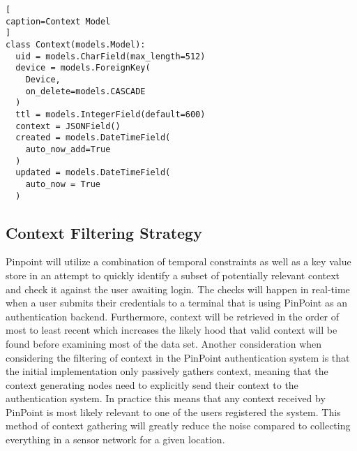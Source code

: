 \documentclass[11pt,journal]{IEEEtran}
\begin{document}
\begin{lstlisting}[
caption=Context Model
]
class Context(models.Model):
  uid = models.CharField(max_length=512)
  device = models.ForeignKey(
  	Device, 
  	on_delete=models.CASCADE
  )
  ttl = models.IntegerField(default=600)
  context = JSONField()
  created = models.DateTimeField(
  	auto_now_add=True
  )
  updated = models.DateTimeField(
  	auto_now = True
  )
\end{lstlisting}


\subsection{Context Filtering Strategy}
Pinpoint will utilize a combination of temporal constraints as well as a key value store in an attempt to quickly identify a subset of potentially relevant context and check it against the user awaiting login.  The checks will happen in real-time when a user submits their credentials to a terminal that is using PinPoint as an authentication backend.  Furthermore, context will be retrieved in the order of most to least recent which increases the likely hood that valid context will be found before examining most of the data set.  Another consideration when considering the filtering of context in the PinPoint authentication system is that the initial implementation only passively gathers context, meaning that the context generating nodes need to explicitly send their context to the authentication system.  In practice this means that any context received by PinPoint is most likely relevant to one of the users registered the system.  This method of context gathering will greatly reduce the noise compared to collecting everything in a sensor network for a given location.





\end{document}
